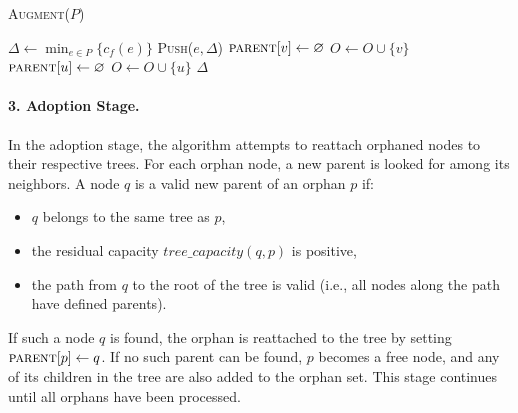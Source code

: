 \begin{algorithm}[H]
\caption{\textsc{Augment}($P$)} 
\begin{algorithmic}[1]
\State $\Delta \gets \min_{e \in P}\{c_f(e) \}$ 
    \State \textsc{Push}($e,\Delta$) 
\EndFor
{}
            \State $\textsc{parent}[v] \gets \varnothing$
            \State $O \gets O \cup \{v\}$ 
            \State $\textsc{parent}[u] \gets \varnothing$
            \State $O \gets O \cup \{u\}$ 
        \EndIf
    \EndIf
\EndFor
\State \Return $\Delta$
\end{algorithmic}
\end{algorithm}

\paragraph*{3. Adoption Stage.}  
In the adoption stage, the algorithm attempts to reattach orphaned nodes to their respective trees. For each orphan node, a new parent is looked for among its neighbors. A node $q$ is a valid new parent of an orphan $p$ if:
\begin{itemize}
    \item $q$ belongs to the same tree as $p$,
    \item the residual capacity $\textit{tree\_capacity}(q, p)$ is positive,
    \item the path from $q$ to the root of the tree is valid (i.e., all nodes along the path have defined parents).
\end{itemize}

If such a node $q$ is found, the orphan is reattached to the tree by setting $\textsc{parent}[p] \gets q$. If no such parent can be found, $p$ becomes a free node, and any of its children in the tree are also added to the orphan set. This stage continues until all orphans have been processed.

